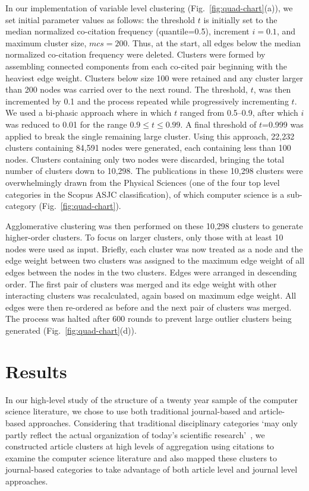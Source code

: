 In our implementation of variable level clustering (Fig.~\ref{fig:quad-chart}(a)), we set initial parameter values as follows: the threshold  $t$  is initially set to  the median normalized co-citation frequency (quantile=0.5), increment $i = 0.1$, and maximum cluster size, $mcs=200$. Thus, at the start, all edges below the median normalized co-citation frequency were deleted. Clusters were formed by assembling connected components from each co-cited pair beginning with the heaviest edge weight. Clusters below size 100 were retained and any cluster larger than 200 nodes was carried over to the next round. The threshold, $t$, was then incremented by 0.1 and the process repeated while progressively incrementing $t$.  We used a bi-phasic approach where in which $t$ ranged from 0.5--0.9, after which $i$ was reduced to 0.01 for the range $0.9 \leq t \leq 0.99$. A final threshold of $t$=0.999 was applied to break the single remaining large cluster.  Using this approach, 22,232 clusters containing 84,591 nodes were generated, each containing less than 100 nodes. Clusters containing only two nodes were discarded, bringing the total number of clusters down to 10,298. The publications in these 10,298 clusters were overwhelmingly drawn from the Physical Sciences (one of the four top level categories in the Scopus ASJC classification), of which computer science is a sub-category (Fig.~\ref{fig:quad-chart}).

Agglomerative clustering was then performed on these 10,298 clusters to generate higher-order clusters. To focus on larger clusters, only those with at least 10 nodes were used as input. Briefly, each cluster was now treated as a node and the edge weight between two clusters was assigned to the maximum edge weight of all edges between the nodes in the two clusters. Edges were arranged in descending order. The first pair of clusters was merged and its edge weight with other interacting clusters was recalculated, again based on maximum edge weight. All edges were then re-ordered as before and the next pair of clusters was merged. The process was halted after 600 rounds to prevent large outlier clusters being generated (Fig.~\ref{fig:quad-chart}(d)).

\clearpage
\section{Results}
\label{sec:results}

In our high-level study of the structure of a twenty year sample of the computer science literature, we chose to use both traditional journal-based and article-based approaches. Considering that traditional disciplinary categories `may only partly reflect the actual organization of today's scientific research'~\cite{waltman_new_2012}, we constructed article clusters at high levels of aggregation using citations to examine the  computer science literature and also mapped these clusters to journal-based categories to take advantage of both article level and journal level approaches.


